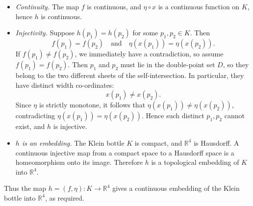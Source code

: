 \documentclass[12pt,a4paper]{article}
\theoremstyle{plain}
\theoremstyle{definition}      %
\begin{document}
\begin{itemize}
	\item \emph{Continuity.}
	The map $f$ is continuous, and $\eta \circ x$ is a continuous function
	on $K$, hence $h$ is continuous.
	
	\item \emph{Injectivity.}
	Suppose $h(p_1) = h(p_2)$ for some $p_1,p_2\in K$.  Then
	\[
	f(p_1) = f(p_2)
	\quad\text{and}\quad
	\eta(x(p_1)) = \eta(x(p_2)).
	\]
	If $f(p_1) \neq f(p_2)$, we immediately have a contradiction, so assume
	$f(p_1) = f(p_2)$.  Then $p_1$ and $p_2$ must lie in the double-point set
	$D$, so they belong to the two different sheets of the self-intersection.
	In particular, they have distinct width co-ordinates:
	\[
	x(p_1) \neq x(p_2).
	\]
	Since $\eta$ is strictly monotone, it follows that
	$\eta(x(p_1)) \neq \eta(x(p_2))$, contradicting
	$\eta(x(p_1)) = \eta(x(p_2))$.  Hence such distinct $p_1,p_2$ cannot
	exist, and $h$ is injective.
	
	\item \emph{$h$ is an embedding.}
	The Klein bottle $K$ is compact, and $\mathbb{R}^4$ is Hausdorff.
	A continuous injective map from a compact space to a Hausdorff space
	is a homeomorphism onto its image.  Therefore $h$ is a topological
	embedding of $K$ into $\mathbb{R}^4$.
\end{itemize}

Thus the map $h = (f,\eta) : K \to \mathbb{R}^4$ gives a continuous embedding
of the Klein bottle into $\mathbb{R}^4$, as required.

\end{document}
